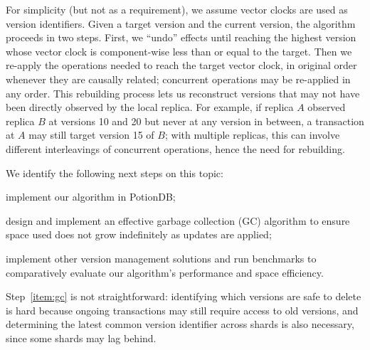For simplicity (but not as a requirement), we assume vector clocks are used as version identifiers.
Given a target version and the current version, the algorithm proceeds in two steps.
First, we ``undo'' effects until reaching the highest version whose vector clock is component-wise less than or equal to the target.
Then we re-apply the operations needed to reach the target vector clock, in original order whenever they are causally related; concurrent operations may be re-applied in any order.
This rebuilding process lets us reconstruct versions that may not have been directly observed by the local replica.
For example, if replica $A$ observed replica $B$ at versions 10 and 20 but never at any version in between, a transaction at $A$ may still target version 15 of $B$; with multiple replicas, this can involve different interleavings of concurrent operations, hence the need for rebuilding.


We identify the following next steps on this topic:
\begin{enumerate*}[label=(\roman*)]
	\item \label{item:vms} implement our algorithm in PotionDB;
	\item \label{item:gc} design and implement an effective garbage collection (GC) algorithm to ensure space used does not grow indefinitely as updates are applied;
	\item \label{item:benchmarkVms} implement other version management solutions and run benchmarks to comparatively evaluate our algorithm's performance and space efficiency.
\end{enumerate*}
Step~\ref{item:gc} is not straightforward: identifying which versions are safe to delete is hard because ongoing transactions may still require access to old versions, and determining the latest common version identifier across shards is also necessary, since some shards may lag behind.

